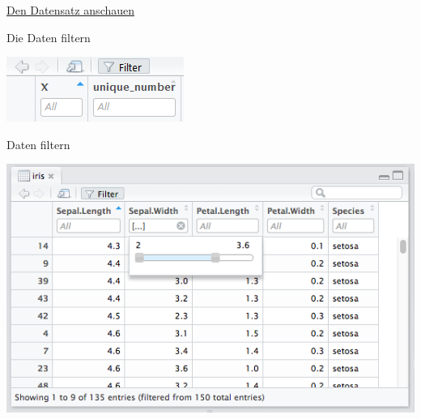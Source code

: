 \documentclass[ignorenonframetext,]{beamer}
\begin{document}
\begin{frame}{\href{https://support.rstudio.com/hc/en-us/articles/205175388-Using-the-Data-Viewer}{Den
Datensatz anschauen}}

\begin{block}{Die Daten filtern}

\includegraphics{./tex2pdf.956/ede672ed41a6acc2a56fb75762d0f0d2d7529ef2.png}

\end{block}

\end{frame}

\begin{frame}{Daten filtern}

\includegraphics{./tex2pdf.956/35dc4a58b2ab7a9ea8377ea6129b7c5fc8d08014.png}

\end{frame}
\end{document}
